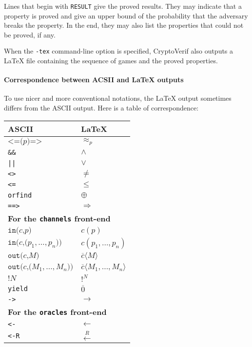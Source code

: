 \documentclass{article}
\begin{document}
Lines that begin with \texttt{RESULT} give the proved results.
They may indicate that a property is proved and give 
an upper bound of the probability that the adversary breaks
the property. 
%
In the end, they may also list the properties that could not be
proved, if any.

When the \texttt{-tex} command-line option is specified,
CryptoVerif also outputs a {\LaTeX} file containing the 
sequence of games and the proved properties.

\paragraph{Correspondence between ACSII and {\LaTeX} outputs}

To use nicer and more conventional notations, the {\LaTeX} output sometimes
differs from the ASCII output. Here is a table of correspondence:
\begin{center}
\begin{tabular}{l|l}
ASCII&{\LaTeX}\\
\hline
$\texttt{<=(}p\texttt{)=>}$& $\approx_p$\\
\texttt{\&\&}&$\wedge$\\
\texttt{||}&$\vee$\\
\texttt{<>}&$\neq$\\
\texttt{<=}&$\leq$\\
\texttt{orfind}&$\oplus$\\
\texttt{==>}&$\Longrightarrow$\\
\hline
\multicolumn{2}{l}{\textbf{For the \texttt{channels} front-end}}\\
\hline
$\texttt{in(}c\texttt{,}p\texttt{)}$& $c(p)$\\
$\texttt{in(}c\texttt{,(}p_1, \ldots, p_n\texttt{))}$& $c(p_1, \ldots, p_n)$\\
$\texttt{out(}c\texttt{,}M\texttt{)}$& $\overline{c}\langle M\rangle$\\
$\texttt{out(}c\texttt{,(}M_1, \ldots, M_n\texttt{))}$& $\overline{c}\langle M_1, \ldots, M_n\rangle$\\
$\texttt{!}N$&$!^N$\\
\texttt{yield}& $\overline{0}$\\
\texttt{->}& $\rightarrow$\\
\hline
\multicolumn{2}{l}{\textbf{For the \texttt{oracles} front-end}}\\
\hline
\texttt{<-}&$\leftarrow$\\
\texttt{<-R}&$\stackrel{R}{\leftarrow}$\\
\end{tabular}
\end{center}
\end{document}
